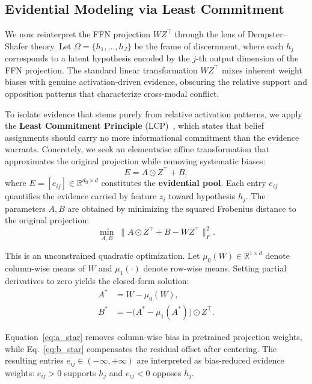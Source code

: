 \documentclass[preprint,12pt]{elsarticle}
\begin{document}
\subsection{Evidential Modeling via Least Commitment}

We now reinterpret the FFN projection $W Z^{\top}$ through the lens of Dempster--Shafer theory. Let $\Omega = \{h_1, \ldots, h_J\}$ be the frame of discernment, where each $h_j$ corresponds to a latent hypothesis encoded by the $j$-th output dimension of the FFN projection. The standard linear transformation $W Z^{\top}$ mixes inherent weight biases with genuine activation-driven evidence, obscuring the relative support and opposition patterns that characterize cross-modal conflict.

To isolate evidence that stems purely from relative activation patterns, we apply the \textbf{Least Commitment Principle} (LCP)~\cite{smets1993belief}, which states that belief assignments should carry no more informational commitment than the evidence warrants. Concretely, we seek an elementwise affine transformation that approximates the original projection while removing systematic biases:
\begin{equation}
E = A \odot Z^{\top} + B,
\label{eq:evidential_pool}
\end{equation}
where $E = [e_{ij}] \in \mathbb{R}^{d_{\text{ff}} \times d}$ constitutes the \textbf{evidential pool}. Each entry $e_{ij}$ quantifies the evidence carried by feature $z_i$ toward hypothesis $h_j$. The parameters $A, B$ are obtained by minimizing the squared Frobenius distance to the original projection:
\begin{equation}
\min_{A, B} \; \bigl\| A \odot Z^{\top} + B - W Z^{\top} \bigr\|_F^2.
\label{eq:lcp_objective}
\end{equation}

This is an unconstrained quadratic optimization. Let $\mu_0(W) \in \mathbb{R}^{1 \times d}$ denote column-wise means of $W$ and $\mu_1(\cdot)$ denote row-wise means. Setting partial derivatives to zero yields the closed-form solution:
\begin{align}
A^* &= W - \mu_0(W), \label{eq:a_star} \\[4pt]
B^* &= -\bigl(A^* - \mu_1(A^*)\bigr) \odot Z^{\top}. \label{eq:b_star}
\end{align}

Equation~\eqref{eq:a_star} removes column-wise bias in pretrained projection weights, while Eq.~\eqref{eq:b_star} compensates the residual offset after centering. The resulting entries $e_{ij} \in (-\infty, +\infty)$ are interpreted as bias-reduced evidence weights: $e_{ij}>0$ supports $h_j$ and $e_{ij}<0$ opposes $h_j$.
\end{document}
